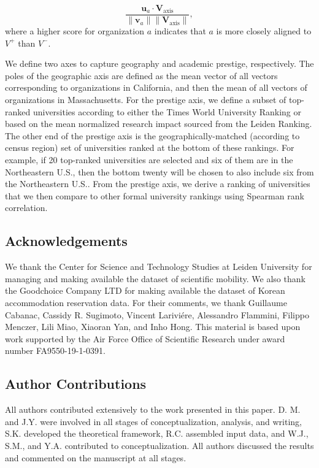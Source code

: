 \documentclass[12pt]{article} %
\begin{document}
\begin{equation}
\frac{\bm{u}_{a} \cdot \bm{V}_{\text{axis}}}{\lVert \bm{v}_{a} \rVert \lVert \bm{V}_{\text{axis}} \rVert},
\end{equation}
where a higher score for organization $a$ indicates that $a$ is more closely aligned to $V^+$ than $V^-$.

We define two axes to capture geography and academic prestige, respectively.
The poles of the geographic axis are defined as the mean vector of all vectors corresponding to organizations in California, and then the mean of all vectors of organizations in Massachusetts.
For the prestige axis, we define a subset of top-ranked universities according to either the Times World University Ranking or based on the mean normalized research impact sourced from the Leiden Ranking.
The other end of the prestige axis is the geographically-matched (according to census region) set of universities ranked at the bottom of these rankings.
For example, if 20 top-ranked universities are selected and six of them are in the Northeastern U.S., then the bottom twenty will be chosen to also include six from the Northeastern U.S..
From the prestige axis, we derive a ranking of universities that we then compare to other formal university rankings using Spearman rank correlation.


%
%
\subsection*{Acknowledgements}
We thank the Center for Science and Technology Studies at Leiden University for managing and making available the dataset of scientific mobility. We also thank the  Goodchoice Company LTD for making  available the dataset of Korean accommodation reservation data.
For their comments, we thank Guillaume Cabanac, Cassidy R. Sugimoto, Vincent Lariviére, Alessandro Flammini, Filippo Menczer, Lili Miao, Xiaoran Yan, and Inho Hong. 
This material is based upon work supported by the Air Force Office of Scientific Research under award number FA9550-19-1-0391.


%
% 
\subsection*{Author Contributions}
All authors contributed extensively to the work presented in this paper. 
D. M. and J.Y. were involved in all stages of conceptualization, analysis, and writing, S.K. developed the theoretical framework, R.C. assembled input data, and W.J., S.M., and Y.A. contributed to conceptualization. 
All authors discussed the results and commented on the manuscript at all stages.
\end{document}

